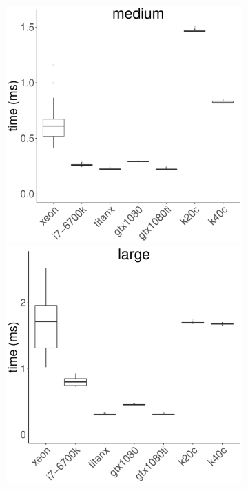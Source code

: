 \documentclass[../document.tex]{subfiles}
\begin{document}
\begin{figure}
\begin{subfigure}{0.9\textwidth}
		\includegraphics[width=\plotwidth]{figures/time-results/generate_csr_medium_boxplot-1}
		\includegraphics[width=\plotwidth]{figures/time-results/generate_csr_large_boxplot-1}
	\end{subfigure}
	

\end{figure}
\end{document}
